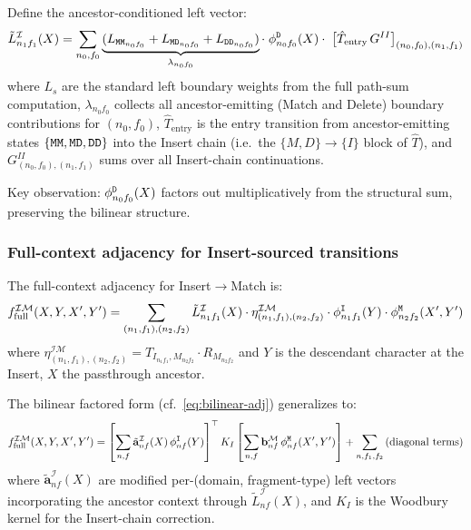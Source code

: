 \documentclass{article}
\newcommand\dom{n}
\newcommand\mat{{\tt M}}
\newcommand\ins{{\tt I}}
\newcommand\del{{\tt D}}
\newcommand\effT{\hat{T}}
\newcommand\frag{f}
\begin{document}
Define the ancestor-conditioned left vector:
\[
\tilde{L}^{\mathcal{I}}_{\dom_1\frag_1}(X) = \sum_{\dom_0,\frag_0}
  \underbrace{(L_{\mat\mat_{\dom_0\frag_0}} + L_{\mat\del_{\dom_0\frag_0}}
              + L_{\del\del_{\dom_0\frag_0}})}_{\lambda_{\dom_0\frag_0}}
  \cdot\; \phi^{\del}_{\dom_0\frag_0}(X)
  \cdot\; \bigl[\effT_{\text{entry}}\, G^{II}\bigr]_{(\dom_0,\frag_0),(\dom_1,\frag_1)}
\]
where $L_s$ are the standard left boundary weights from the full
path-sum computation, $\lambda_{\dom_0\frag_0}$ collects all
ancestor-emitting (Match and Delete) boundary contributions for
$(\dom_0, \frag_0)$, $\effT_{\text{entry}}$ is the entry transition
from ancestor-emitting states $\{\mat\mat, \mat\del, \del\del\}$ into
the Insert chain (i.e.\ the $\{M,D\} \to \{I\}$ block of $\effT$),
and $G^{II}_{(\dom_0,\frag_0),(\dom_1,\frag_1)}$ sums over all
Insert-chain continuations.

Key observation: $\phi^{\del}_{\dom_0\frag_0}(X)$ factors out
multiplicatively from the structural sum, preserving the bilinear
structure.

\subsubsection{Full-context adjacency for Insert-sourced transitions}

The full-context adjacency for Insert$\to$Match is:
\begin{equation}\label{eq:full-im}
f^{\mathcal{I}\mathcal{M}}_{\text{full}}(X, Y, X', Y')
= \sum_{(\dom_1,\frag_1),(\dom_2,\frag_2)}
  \tilde{L}^{\mathcal{I}}_{\dom_1\frag_1}(X)
  \cdot \eta^{\mathcal{IM}}_{(\dom_1,\frag_1),(\dom_2,\frag_2)}
  \cdot \phi^{\ins}_{\dom_1\frag_1}(Y)
  \cdot \phi^{\mat}_{\dom_2\frag_2}(X', Y')
\end{equation}
where $\eta^{\mathcal{IM}}_{(\dom_1,\frag_1),(\dom_2,\frag_2)}
= T_{I_{\dom_1\frag_1}, M_{\dom_2\frag_2}} \cdot R_{M_{\dom_2\frag_2}}$
and $Y$ is the descendant character at the Insert,
$X$ the passthrough ancestor.

The bilinear factored form (cf.~\eqref{eq:bilinear-adj}) generalizes to:
\begin{equation}\label{eq:bilinear-full}
f^{\mathcal{I}\mathcal{M}}_{\text{full}}(X, Y, X', Y')
= \left[\sum_{\dom,\frag} \tilde{\mathbf{a}}^{\mathcal{I}}_{\dom\frag}(X)\,
        \phi^{\ins}_{\dom\frag}(Y) \right]^\top
  K_I
  \left[\sum_{\dom,\frag} \mathbf{b}^{\mathcal{M}}_{\dom\frag}\,
        \phi^{\mat}_{\dom\frag}(X', Y')\right]
  + \sum_{\dom,\frag_1,\frag_2} \text{(diagonal terms)}
\end{equation}
where $\tilde{\mathbf{a}}^{\mathcal{I}}_{\dom\frag}(X)$ are modified
per-(domain, fragment-type) left vectors incorporating the ancestor
context through $\tilde{L}^{\mathcal{I}}_{\dom\frag}(X)$, and $K_I$ is
the Woodbury kernel for the Insert-chain correction.
\end{document}
